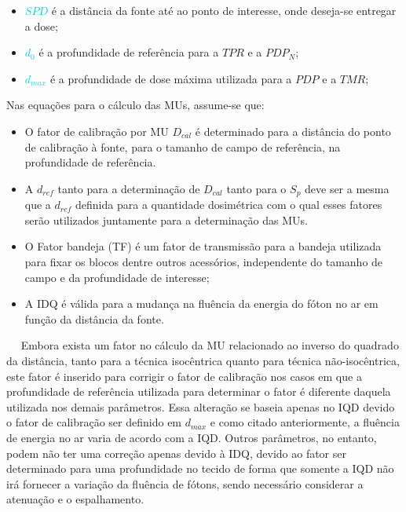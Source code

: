 \documentclass[11pt,a4paper]{article}
\newcounter{exemplo}
\begin{document}
\begin{exemplo}[onde:]
\begin{itemize}
            \item \textcolor{DarkTurquoise}{$SPD$} é a distância da fonte até ao ponto de interesse, onde deseja-se entregar a dose;
            \item \textcolor{DarkTurquoise}{$d_{0}$} é a profundidade de referência para a $TPR$ e a $PDP_N$;
            \item \textcolor{DarkTurquoise}{$d_{max}$} é a profundidade de dose máxima utilizada para a $PDP$ e a $TMR$;
        \end{itemize}
    \end{exemplo}

    \begin{tcolorbox}[width=\textwidth, colback={white}, colbacktitle={DarkTurquoise!50!white}, title={$\bigstar$ \LobsterTwo{Observação} $\bigstar$}, coltitle={CarnationPink}, colframe={DarkTurquoise}, fonttitle=\rmfamily\bfseries\Large, breakable]

    Nas equações para o cálculo das MUs, assume-se que:

    \begin{itemize}[label=\textcolor{CarnationPink}{$\star$}]
        \item O fator de calibração por MU $D_{cal}$ é determinado para a distância do ponto de calibração à fonte, para o tamanho de campo de referência, na profundidade de referência.
        \item A $d_{ref}$ tanto para a determinação de $D_{cal}$ tanto para o $S_p$ deve ser a mesma que  a $d_{ref}$ definida para a quantidade dosimétrica com o qual esses fatores serão utilizados juntamente para a determinação das MUs.
        \item O Fator bandeja (TF) é um fator de transmissão para a bandeja utilizada para fixar os blocos dentre outros acessórios, independente do tamanho de campo e da profundidade de interesse;
        \item A IDQ é válida para a mudança na fluência da energia do fóton no ar em função da distância da fonte. 
    \end{itemize}

        $\quad$ Embora exista um fator no cálculo da MU relacionado ao inverso do quadrado da distância, tanto para a técnica isocêntrica quanto para técnica não-isocêntrica, este fator é inserido para corrigir o fator de calibração nos casos em que a profundidade de referência utilizada para determinar o fator é diferente daquela utilizada nos demais parâmetros. Essa alteração se baseia apenas no IQD devido o fator de calibração ser definido em $d_{max}$ e como citado anteriormente, a fluência de energia no ar varia de acordo com a IQD. Outros parâmetros, no entanto, podem não ter uma correção apenas devido à IDQ, devido ao fator ser determinado para uma profundidade no tecido de forma que somente a IQD não irá fornecer a variação da fluência de fótons, sendo necessário considerar a atenuação e o espalhamento. 
    \end{tcolorbox}
\end{document}
